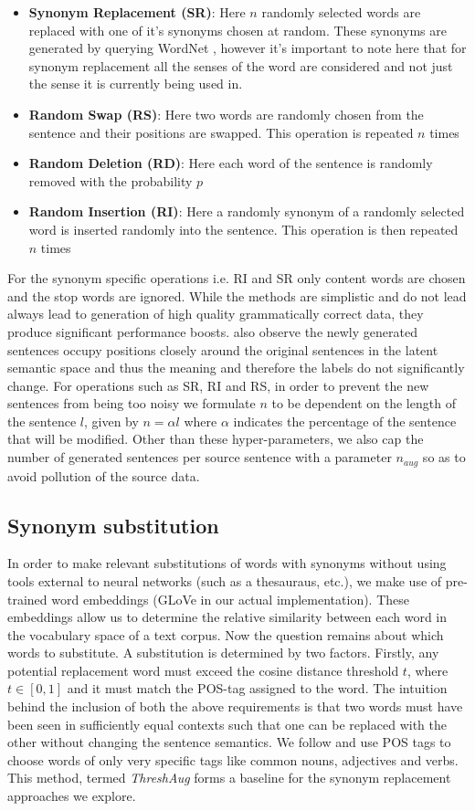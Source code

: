 \documentclass[11pt,a4paper]{article}
\begin{document}
\begin{itemize}
\item \textbf{Synonym Replacement (SR)}: Here $n$ randomly selected words are replaced with one of it's synonyms chosen at random. These synonyms are generated by querying WordNet \cite{WordNet}, however it's important to note here that for synonym replacement all the senses of the word are considered and not just the sense it is currently being used in. 
\item \textbf{Random Swap (RS)}: Here two words are randomly chosen from the sentence and their positions are swapped. This operation is repeated $n$ times
\item \textbf{Random Deletion (RD)}: Here each word of the sentence is randomly removed with the probability $p$
\item \textbf{Random Insertion (RI)}: Here a randomly synonym of a randomly selected word is inserted randomly into the sentence. This operation is then repeated $n$ times 
\end{itemize}

For the synonym specific operations i.e. RI and SR only content words are chosen and the stop words are ignored. While the methods are simplistic and do not lead always lead to generation of high quality grammatically correct data, they produce significant performance boosts. \citet{wei-zou-2019-eda} also observe the newly generated sentences occupy positions closely around the original sentences in the latent semantic space and thus the meaning and therefore the labels do not significantly change. For operations such as SR, RI and RS, in order to prevent the new sentences from being too noisy we formulate $n$ to be dependent on the length of the sentence $l$, given by $n = \alpha l $ where $\alpha$ indicates the percentage of the sentence that will be modified. Other than these hyper-parameters, we also cap the number of generated sentences per source sentence with a parameter $n_{aug}$ so as to avoid pollution of the source data. 

\subsection{Synonym substitution}
In order to make relevant substitutions of words with synonyms without using tools external to neural networks (such as a thesauraus, etc.), we make use of pre-trained word embeddings (GLoVe in our actual implementation). These embeddings allow us to determine the relative similarity between each word in the vocabulary space of a text corpus. Now the question remains about which words to substitute. A substitution is
determined by two factors. Firstly, any potential replacement word
must exceed the cosine distance threshold $t$, where $t \in  [0, 1]$ and it
must match the POS-tag assigned to the word. The intuition behind the inclusion of both the above requirements is that two words must have been seen in sufficiently equal contexts such that one can be
replaced with the other without changing the sentence semantics. We follow \citet{aug2prev} and use POS tags to choose words of only very specific tags like common nouns, adjectives and verbs. This method, termed \textit{ThreshAug} forms a baseline for the synonym replacement approaches we explore.
\end{document}
